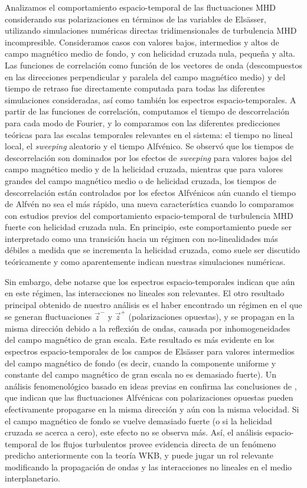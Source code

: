 Analizamos el comportamiento espacio-temporal de las fluctuaciones MHD
considerando sus polarizaciones en términos de las variables de
Els\"asser, utilizando simulaciones numéricas directas
tridimensionales de turbulencia MHD incompresible. Consideramos casos
con valores bajos, intermedios y altos de campo magnético medio de
fondo, y con helicidad cruzada nula, pequeña y alta. Las funciones de
correlación como función de los vectores de onda (descompuestos en las
direcciones perpendicular y paralela del campo magnético medio) y del
tiempo de retraso fue directamente computada para todas las diferentes
simulaciones consideradas, así como también los espectros
espacio-temporales. A partir de las funciones de correlación,
computamos el tiempo de descorrelación para cada modo de Fourier, y lo
comparamos con las diferentes predicciones teóricas para las escalas
temporales relevantes en el sistema: el tiempo no lineal local, el
\textit{sweeping} aleatorio y el tiempo Alfvénico. Se observó que los tiempos
de descorrelación son dominados por los efectos de \textit{sweeping} para
valores bajos del campo magnético medio y de la helicidad cruzada,
mientras que para valores grandes del campo magnético medio o de
helicidad cruzada, los tiempos de descorrelación están controlados por
los efectos Alfvénicos aún cuando el tiempo de Alfvén no sea el más
rápido, una nueva característica cuando lo comparamos con estudios
previos del comportamiento espacio-temporal de turbulencia MHD fuerte
con helicidad cruzada nula. En principio, este comportamiento puede
ser interpretado como una transición hacia un régimen con
no-linealidades más débiles a medida que se incrementa la helicidad
cruzada, como suele ser discutido teóricamente y como aparentemente
indican nuestras simulaciones numéricas.

Sin embargo, debe notarse que los espectros espacio-temporales indican
que aún en este régimen, las interacciones no lineales son
relevantes. El otro resultado principal obtenido de nuestro análisis
es el haber encontrado un régimen en el que se generan fluctuaciones
$\vec{z}^-$ y $\vec{z}^+$ (polarizaciones opuestas), y se propagan en
la misma dirección debido a la reflexión de ondas, causada por
inhomogeneidades del campo magnético de gran escala. Este resultado es más
evidente en los espectros espacio-temporales de los campos de
Els\"asser para valores intermedios del campo magnético de fondo (es
decir, cuando la componente uniforme y constante del campo magnético
de gran escala no es demasiado fuerte). Un análisis fenomenológico
basado en ideas previas en \cite{zhou1990remarks}
confirma las conclusiones de \cite{hollweg_1990_wkb}, que indican que
las fluctuaciones Alfvénicas con polarizaciones opuestas pueden
efectivamente propagarse en la misma dirección y aún con la misma
velocidad.  Si el campo magnético de fondo se vuelve demasiado fuerte
(o si la helicidad cruzada se acerca a cero), este efecto no se
observa más. Así, el análisis espacio-temporal de los flujos
turbulentos provee evidencia directa de un fenómeno predicho
anteriormente con la teoría WKB, y puede jugar un rol relevante
modificando la propagación de ondas y las interacciones no lineales en
el medio interplanetario.

